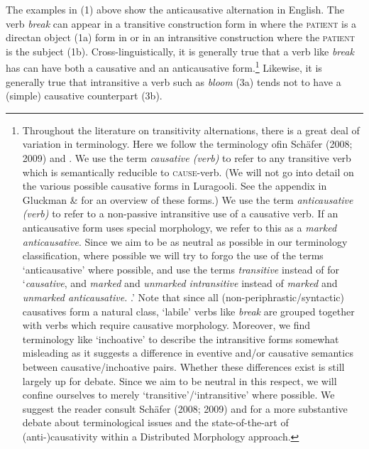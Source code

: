 \documentclass[output=paper]{langsci/langscibook}
\begin{document}
The examples in (1) above show the anticausative alternation in English. The verb \textit{break} can appear in a transitive construction form in where the \textsc{patient} is a directan object (1a) form in or in an intransitive construction where the \textsc{patient} is the subject (1b). Cross-linguistically, it is generally true that a verb like \textit{break} has can have both a causative and an anticausative form.\footnote{ Throughout the literature on transitivity alternations, there is a great deal of variation in terminology. Here we follow the terminology ofin Schäfer (2008; 2009) and \citet{AlexiadouEtAl2015}. We use the term \textit{causative (verb)} to refer to any transitive verb which is semantically reducible to \textsc{cause}{}-verb. (We will not go into detail on the various possible causative forms in Luragooli. See the appendix in Gluckman \& \citet{Bowler2015} for an overview of these forms.) We use the term \textit{anticausative (verb)} to refer to a non-passive intransitive use of a causative verb. If an anticausative form uses special morphology, we refer to this as a \textit{marked anticausative}. Since we aim to be as neutral as possible in our terminology classification, where possible we will try to forgo the use of the terms ‘anticausative’ where possible, and use the terms \textit{transitive} instead of for ‘\textit{causative}, and \textit{marked} and \textit{unmarked intransitive }instead of \textit{marked }and \textit{unmarked anticausative.} .’ Note that since all (non-periphrastic/syntactic) causatives form a natural class, ‘labile’ verbs like \textit{break} are grouped together with verbs which require causative morphology. Moreover, we find terminology like ‘inchoative’ \textit{ }to describe the intransitive forms somewhat misleading as it suggests a difference in eventive and/or causative semantics between causative/inchoative pairs. Whether these differences exist is still largely up for debate. Since we aim to be neutral in this respect, we will confine ourselves to merely ‘transitive’/‘intransitive’ where possible. We suggest the reader consult Schäfer (2008; 2009) and \citet{AlexiadouEtAl2015} for a more substantive debate about terminological issues and the state-of-the-art of (anti-)causativity within a Distributed Morphology approach.}%
%
 Likewise, it is generally true that intransitive a verb such as \textit{bloom} (3a) tends not to have a (simple) causative counterpart (3b).
\end{document}

